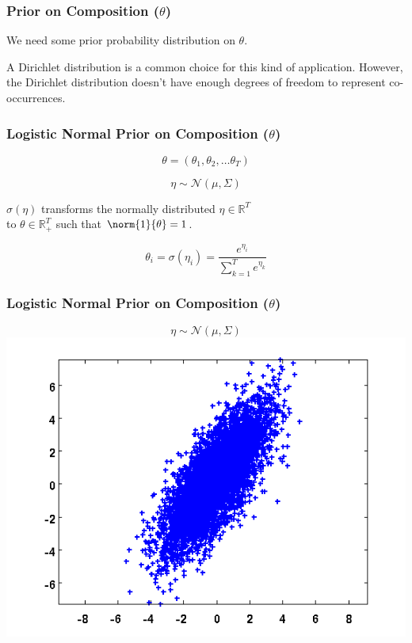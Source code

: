 \begin{frame}
  \frametitle{Prior on Composition ($\theta$)}
  \begin{center}
    We need some prior probability distribution on $\theta$.
    \vspace{0.3in}

    A Dirichlet distribution is a common choice for this kind of application.
    However, the Dirichlet distribution doesn't have enough degrees of freedom to represent co-occurrences.
  \end{center}
\end{frame}

\begin{frame}
  \frametitle{Logistic Normal Prior on Composition ($\theta$)}
  \begin{center}
    \begin{equation*}
      \theta = ( \theta_1, \theta_2, \dots \theta_T )
    \end{equation*}

    \begin{equation*}
      \eta \sim \mathcal{N}(\mu, \Sigma)
    \end{equation*}

    $\sigma(\eta)$ transforms the normally distributed $\eta \in \mathbb{R}^T$ \\
    to $\theta \in \mathbb{R}_+^T$ such that $\norm{1}{\theta} = 1$.

    \begin{equation*}
      \theta_i = \sigma(\eta_i) = \frac{e^{\eta_i}}{\sum_{k=1}^{T}e^{\eta_k}}
    \end{equation*}
  \end{center}
\end{frame}

\begin{frame}
  \frametitle{Logistic Normal Prior on Composition ($\theta$)}
  \begin{center}
    \vspace{-0.4in}
    \begin{equation*}
      \eta \sim \mathcal{N}(\mu, \Sigma)
    \end{equation*}
    \includegraphics[scale=0.6]{img/log-normal-figs/normal-1.png}
  \end{center}
\end{frame}

